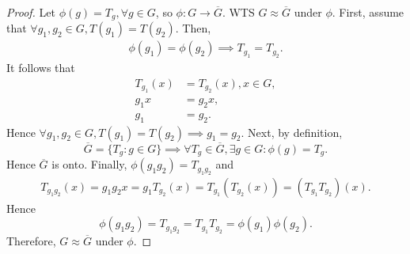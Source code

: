 \documentclass{article}
\theoremstyle{definition}
\begin{document}
\begin{proof}
     Let $\phi(g) = T_g, \forall g \in G$, so $\phi: G \to \overline{G}$. WTS $G \approx \overline{G}$ under $\phi$. First, assume that $\forall g_1,g_2 \in G, T(g_1)=T(g_2)$. Then,
     \begin{align*}
         \phi(g_1) = \phi(g_2) \implies T_{g_1} = T_{g_2}.
     \end{align*}
     It follows that
     \begin{align*}
         T_{g_1}(x) &= T_{g_2}(x), x \in G, \\
         g_1x &= g_2x, \\
         g_1 &= g_2.
     \end{align*}
     Hence $\forall g_1,g_2 \in G, T(g_1)=T(g_2) \implies g_1 = g_2$. Next, by definition,
     \begin{equation*}
         \overline{G} = \{T_g:g \in G\} \implies \forall T_g \in \overline{G}, \exists g \in G: \phi(g) = T_g. 
     \end{equation*}
     Hence $\overline{G}$ is onto. Finally, $\phi(g_1g_2) = T_{g_1g_2}$ and
     \begin{align*}
         T_{g_1g_2}(x) = g_1g_2x = g_1T_{g_2}(x) = T_{g_1}(T_{g_2}(x)) = (T_{g_1}T_{g_2})(x).
     \end{align*}
     Hence
     \begin{equation*}
         \phi(g_1g_2) = T_{g_1g_2} = T_{g_1}T_{g_2} = \phi(g_1)\phi(g_2).
     \end{equation*}
     Therefore, $G \approx \overline{G}$ under $\phi$.
 \end{proof}
 
\end{document}
